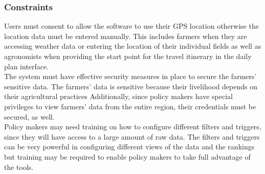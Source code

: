 \subsubsection{Constraints}
\begin{flushleft}
Users must consent to allow the software to use their GPS location otherwise the location data must be entered manually. This includes farmers when they are accessing weather data or entering the location of their individual fields as well as agronomists when providing the start point for the travel itinerary in the daily plan interface. \\
\smallskip
The system must have effective security measures in place to secure the farmers' sensitive data. The farmers' data is sensitive because their livelihood depends on their agricultural practices Additionally, since policy makers have special privileges to view farmers' data from the entire region, their credentials must be secured, as well. \\
\smallskip
Policy makers may need training on how to configure different filters and triggers, since they will have access to a large amount of raw data. The filters and triggers can be very powerful in configuring different views of the data and the rankings but training may be required to enable policy makers to take full advantage of the tools. 
\end{flushleft}
